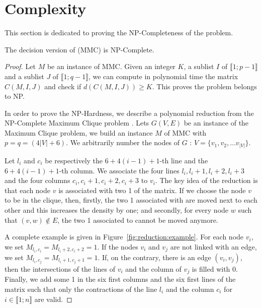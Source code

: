 \section{Complexity}
\label{sect:complexity}
 
This section is dedicated to proving the NP-Completeness of the problem.

  \begin{theorem}
  \label{theo:complexity}
  The decision version of (MMC) is NP-Complete.
  \end{theorem}
  \begin{proof}
 

    Let $M$ be an instance of MMC. Given an integer $K$, a sublist $I$ of $\llbracket 1; p-1 \rrbracket$ and a sublist $J$ of $\llbracket 1; q-1 \rrbracket$, we can compute in polynomial time the matrix $C(M,I,J)$ and check if $d(C(M,I,J)) \geq K$. This proves the problem belongs to NP.

    In order to prove the NP-Hardness, we describe a polynomial reduction from the NP-Complete Maximum Clique problem \cite{Karp1972}. Lets $G(V,E)$ be an instance of the Maximum Clique problem, we build an instance $M$ of MMC with $p = q = (4|V| + 6)$. We arbitrarily number the nodes of $G$ : $V = \{v_1, v_2, \dots v_{|V|}\}$.

    Let $l_i$ and $c_i$ be respectively the $6+4(i-1)+1$-th line and the $6+4(i-1)+1$-th column. We associate the four lines $l_i, l_i+1, l_i+2, l_i+3$ and the four columns $c_i, c_i +1, c_i+2, c_i + 3$ to $v_i$. The key idea of the reduction is that each node $v$ is associated with two 1 of the matrix. If we choose the node $v$ to be in the clique, then, firstly, the two 1 associated with are moved next to each other and this increases the density by one; and secondly, for every node $w$ such that $(v,w) \not\in E$, the two 1 associated to cannot be moved anymore.

A complete example is given in Figure~\ref{fig:reduction:example}. For each node $v_i$, we set $M_{l_i,c_i} = M_{l_i+2,c_i+2} = 1$. If the nodes $v_i$ and $v_j$ are not linked with an edge, we set $M_{l_i,c_j} = M_{l_i+1,c_j+1} = 1$. If, on the contrary, there is an edge $(v_i,v_j)$, then the intersections of the lines of $v_i$ and the column of $v_j$ is filled with 0. Finally, we add some 1 in the six first columns and the six first lines of the matrix such that only the contractions of the line $l_i$ and the column $c_i$ for $i \in \llbracket 1;n \rrbracket$ are valid.



\end{proof}
